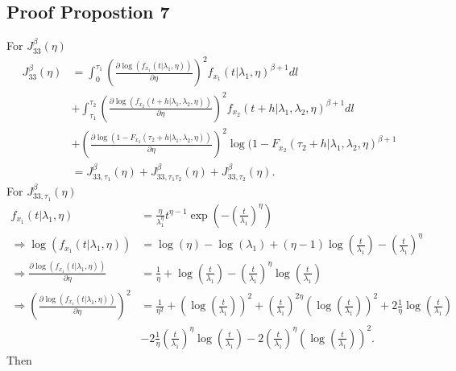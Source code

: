 \documentclass{article}
\begin{document}
\subsection{Proof Propostion 7}
For $J_{33}^{\beta}(\eta)$
\begin{align*}
J_{33}^{\beta}(\eta)&=\int_{0}^{\tau_1}\left(\frac{\partial \log(f_{x_1}(t|\lambda_1,\eta))}{\partial \eta} \right)^2f_{x_1}(t|\lambda_1,\eta)^{\beta+1}dl
\\
&+\int_{\tau_1}^{\tau_2}\left(\frac{\partial \log(f_{x_2}(t+h|\lambda_1,\lambda_2,\eta))}{\partial \eta} \right)^2f_{x_2}(t+h|\lambda_1,\lambda_2,\eta)^{\beta+1}dl
\\
&+\left(\frac{\partial \log(1-F_{x_2}(\tau_2+h|\lambda_1,\lambda_2,\eta))}{\partial \eta} \right)^2 \log(1-F_{x_2}(\tau_2+h|\lambda_1,\lambda_2,\eta)^{\beta+1}
\\&=J_{33,\tau_1}^{\beta}(\eta)+J_{33,\tau_1\tau_2}^{\beta}(\eta)+J_{33,\tau_2}^{\beta}(\eta).
\end{align*}
For $J_{33,\tau_1}^{\beta}(\eta)$
\begin{align}
f_{x_1}(t|\lambda_1,\eta)&=\frac{\eta}{\lambda_1^{\eta}}t^{\eta-1}\exp\left(-\left(\frac{t}{\lambda_1}\right)^{\eta}\right) \nonumber
\\
\Rightarrow \log\left(f_{x_1}(t|\lambda_1,\eta)\right)&=\log(\eta)-\log(\lambda_1)+(\eta-1)\log\left(\frac{t}{\lambda_1}\right)-\left(\frac{t}{\lambda_1}\right)^{\eta} \nonumber
\\
\Rightarrow \frac{\partial \log\left(f_{x_1}(t|\lambda_1,\eta)\right)}{\partial \eta}&=\frac{1}{\eta}+\log\left(\frac{t}{\lambda_1}\right)-\left(\frac{t}{\lambda_1}\right)^{\eta}\log\left(\frac{t}{\lambda_1}\right) \nonumber
\\
\Rightarrow \left(\frac{\partial \log\left(f_{x_1}(t|\lambda_1,\eta)\right)}{\partial \eta}\right)^2&=\frac{1}{\eta^2}+\left(\log\left(\frac{t}{\lambda_1}\right)\right)^2+\left(\frac{t}{\lambda_1}\right)^{2\eta}\left(\log\left(\frac{t}{\lambda_1}\right)\right)^2+2\frac{1}{\eta}\log\left(\frac{t}{\lambda_1}\right) \nonumber
\\
&-2\frac{1}{\eta}\left(\frac{t}{\lambda_1}\right)^{\eta}\log\left(\frac{t}{\lambda_1}\right)-2\left(\frac{t}{\lambda_1}\right)^{\eta}\left(\log\left(\frac{t}{\lambda_1}\right)\right)^2 .
 \label{eq:dev_f1_eta}
\end{align}
Then
\end{document}
